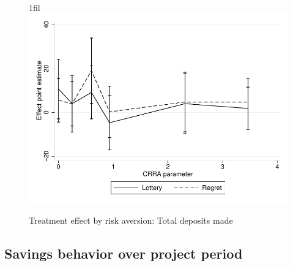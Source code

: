 \documentclass[10pt]{article}
\makeatletter
\newcommand*{\centerfloat}{%
  \parindent \z@
  \leftskip \z@ \@plus 1fil \@minus \textwidth
  \rightskip\leftskip
  \parfillskip \z@skip}
\makeatother
\begin{document}
		\begin{figure}[h]
		\centering
		\caption{Treatment effect by risk aversion: Total deposits made}
		\centerfloat
		\includegraphics[width=\textwidth]{../../figures/line-mobile_totdepositsbyrisk.pdf}
		\end{figure}

	\clearpage

	\subsection{Savings behavior over project period}
\end{document}
